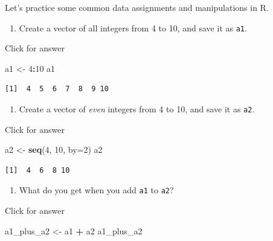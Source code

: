 \documentclass[
]{book}
\newenvironment{Shaded}{\begin{snugshade}}{\end{snugshade}}
\newcommand{\AttributeTok}[1]{\textcolor[rgb]{0.13,0.29,0.53}{#1}}
\newcommand{\DecValTok}[1]{\textcolor[rgb]{0.00,0.00,0.81}{#1}}
\newcommand{\FunctionTok}[1]{\textcolor[rgb]{0.13,0.29,0.53}{\textbf{#1}}}
\newcommand{\NormalTok}[1]{#1}
\newcommand{\OtherTok}[1]{\textcolor[rgb]{0.56,0.35,0.01}{#1}}
\newcommand{\SpecialCharTok}[1]{\textcolor[rgb]{0.81,0.36,0.00}{\textbf{#1}}}
\providecommand{\tightlist}{%
  \setlength{\itemsep}{0pt}\setlength{\parskip}{0pt}}
\begin{document}
Let's practice some common data assignments and manipulations in R.

\begin{enumerate}
\def\labelenumi{\alph{enumi}.}
\tightlist
\item
  Create a vector of all integers from 4 to 10, and save it as \texttt{a1}.
\end{enumerate}

Click for answer

\begin{Shaded}
\begin{Highlighting}[]
\NormalTok{a1 }\OtherTok{\textless{}{-}} \DecValTok{4}\SpecialCharTok{:}\DecValTok{10}
\NormalTok{a1}
\end{Highlighting}
\end{Shaded}

\begin{verbatim}
[1]  4  5  6  7  8  9 10
\end{verbatim}

\begin{enumerate}
\def\labelenumi{\alph{enumi}.}
\setcounter{enumi}{1}
\tightlist
\item
  Create a vector of \emph{even} integers from 4 to 10, and save it as \texttt{a2}.
\end{enumerate}

Click for answer

\begin{Shaded}
\begin{Highlighting}[]
\NormalTok{a2 }\OtherTok{\textless{}{-}} \FunctionTok{seq}\NormalTok{(}\DecValTok{4}\NormalTok{, }\DecValTok{10}\NormalTok{, }\AttributeTok{by=}\DecValTok{2}\NormalTok{)}
\NormalTok{a2}
\end{Highlighting}
\end{Shaded}

\begin{verbatim}
[1]  4  6  8 10
\end{verbatim}

\begin{enumerate}
\def\labelenumi{\alph{enumi}.}
\setcounter{enumi}{2}
\tightlist
\item
  What do you get when you add \texttt{a1} to \texttt{a2}?
\end{enumerate}

Click for answer

\begin{Shaded}
\begin{Highlighting}[]
\NormalTok{a1\_plus\_a2 }\OtherTok{\textless{}{-}}\NormalTok{ a1 }\SpecialCharTok{+}\NormalTok{ a2}
\NormalTok{a1\_plus\_a2}
\end{Highlighting}
\end{Shaded}
\end{document}
